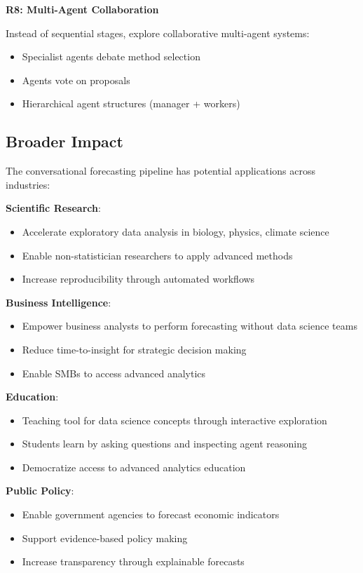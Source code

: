 \documentclass[11pt,a4paper]{article}
\begin{document}
\textbf{R8: Multi-Agent Collaboration}

Instead of sequential stages, explore collaborative multi-agent systems:
\begin{itemize}
    \item Specialist agents debate method selection
    \item Agents vote on proposals
    \item Hierarchical agent structures (manager + workers)
\end{itemize}

\subsection{Broader Impact}

The conversational forecasting pipeline has potential applications across industries:

\textbf{Scientific Research}:
\begin{itemize}
    \item Accelerate exploratory data analysis in biology, physics, climate science
    \item Enable non-statistician researchers to apply advanced methods
    \item Increase reproducibility through automated workflows
\end{itemize}

\textbf{Business Intelligence}:
\begin{itemize}
    \item Empower business analysts to perform forecasting without data science teams
    \item Reduce time-to-insight for strategic decision making
    \item Enable SMBs to access advanced analytics
\end{itemize}

\textbf{Education}:
\begin{itemize}
    \item Teaching tool for data science concepts through interactive exploration
    \item Students learn by asking questions and inspecting agent reasoning
    \item Democratize access to advanced analytics education
\end{itemize}

\textbf{Public Policy}:
\begin{itemize}
    \item Enable government agencies to forecast economic indicators
    \item Support evidence-based policy making
    \item Increase transparency through explainable forecasts
\end{itemize}
\end{document}
